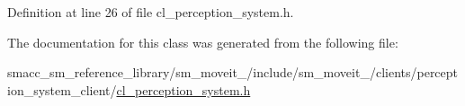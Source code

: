 Definition at line 26 of file cl\+\_\+perception\+\_\+system.\+h.



The documentation for this class was generated from the following file\+:\begin{DoxyCompactItemize}
\item 
smacc\+\_\+sm\+\_\+reference\+\_\+library/sm\+\_\+moveit\+\_/include/sm\+\_\+moveit\+\_/clients/perception\+\_\+system\+\_\+client/\hyperlink{4_2include_2sm__moveit__4_2clients_2perception__system__client_2cl__perception__system_8h}{cl\+\_\+perception\+\_\+system.\+h}\end{DoxyCompactItemize}
